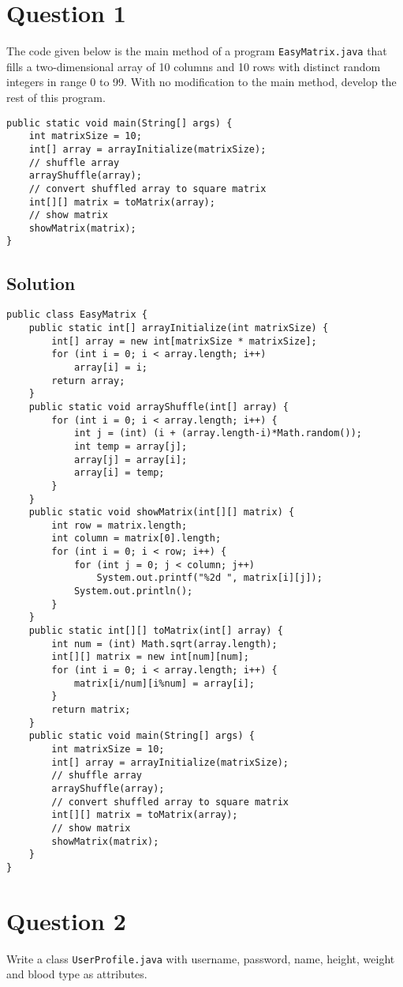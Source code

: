 \section*{Question 1}

The code given below is the main method of a program \texttt{EasyMatrix.java} that fills a two-dimensional array of 10 columns and 10 rows with distinct random integers in range 0 to 99. With no modification to the main method, develop the rest of this program.

\lstset{language=java}
\begin{lstlisting}
public static void main(String[] args) {
	int matrixSize = 10;
	int[] array = arrayInitialize(matrixSize);
	// shuffle array
	arrayShuffle(array);
	// convert shuffled array to square matrix
	int[][] matrix = toMatrix(array);
	// show matrix
	showMatrix(matrix);
}
\end{lstlisting}

\subsection*{Solution}
\lstset{language=java}
\begin{lstlisting}
public class EasyMatrix {
	public static int[] arrayInitialize(int matrixSize) {
		int[] array = new int[matrixSize * matrixSize];
		for (int i = 0; i < array.length; i++)
			array[i] = i;
		return array;
	}
	public static void arrayShuffle(int[] array) {
		for (int i = 0; i < array.length; i++) {
			int j = (int) (i + (array.length-i)*Math.random());
			int temp = array[j];
			array[j] = array[i];
			array[i] = temp;
		}
	}
	public static void showMatrix(int[][] matrix) {
		int row = matrix.length;
		int column = matrix[0].length;
		for (int i = 0; i < row; i++) {
			for (int j = 0; j < column; j++)
				System.out.printf("%2d ", matrix[i][j]);
			System.out.println();
		}
	}
	public static int[][] toMatrix(int[] array) {
		int num = (int) Math.sqrt(array.length);
		int[][] matrix = new int[num][num];
		for (int i = 0; i < array.length; i++) {
			matrix[i/num][i%num] = array[i];
		}
		return matrix;
	}
	public static void main(String[] args) {
		int matrixSize = 10;
		int[] array = arrayInitialize(matrixSize);
		// shuffle array
		arrayShuffle(array);
		// convert shuffled array to square matrix
		int[][] matrix = toMatrix(array);
		// show matrix
		showMatrix(matrix);
	}
}
\end{lstlisting}

\section*{Question 2}
Write a class \texttt{UserProfile.java} with username, password, name, height, weight and blood type as attributes.

